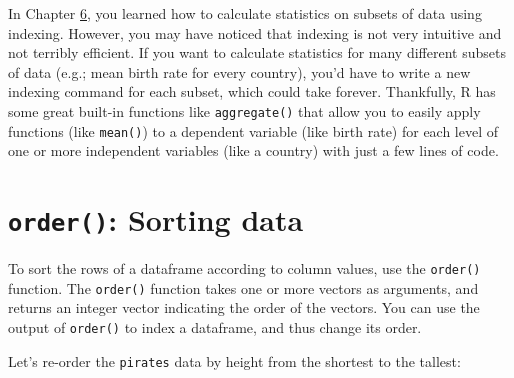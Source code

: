 \documentclass[]{book}
\newenvironment{Shaded}{\begin{snugshade}}{\end{snugshade}}
\newcommand{\KeywordTok}[1]{\textcolor[rgb]{0.13,0.29,0.53}{\textbf{#1}}}
\newcommand{\DataTypeTok}[1]{\textcolor[rgb]{0.13,0.29,0.53}{#1}}
\newcommand{\StringTok}[1]{\textcolor[rgb]{0.31,0.60,0.02}{#1}}
\newcommand{\CommentTok}[1]{\textcolor[rgb]{0.56,0.35,0.01}{\textit{#1}}}
\newcommand{\OperatorTok}[1]{\textcolor[rgb]{0.81,0.36,0.00}{\textbf{#1}}}
\newcommand{\NormalTok}[1]{#1}
\theoremstyle{definition}
\theoremstyle{definition}
\theoremstyle{remark}
\begin{document}
\begin{Shaded}
\end{Shaded}

In Chapter \href{matricesdataframes}{6}, you learned how to calculate
statistics on subsets of data using indexing. However, you may have
noticed that indexing is not very intuitive and not terribly efficient.
If you want to calculate statistics for many different subsets of data
(e.g.; mean birth rate for every country), you'd have to write a new
indexing command for each subset, which could take forever. Thankfully,
R has some great built-in functions like \texttt{aggregate()} that allow
you to easily apply functions (like \texttt{mean()}) to a dependent
variable (like birth rate) for each level of one or more independent
variables (like a country) with just a few lines of code.

\section{\texorpdfstring{\texttt{order()}: Sorting
data}{order(): Sorting data}}\label{order-sorting-data}

To sort the rows of a dataframe according to column values, use the
\texttt{order()} function. The \texttt{order()} function takes one or
more vectors as arguments, and returns an integer vector indicating the
order of the vectors. You can use the output of \texttt{order()} to
index a dataframe, and thus change its order.

Let's re-order the \texttt{pirates} data by height from the shortest to
the tallest:
\end{document}
